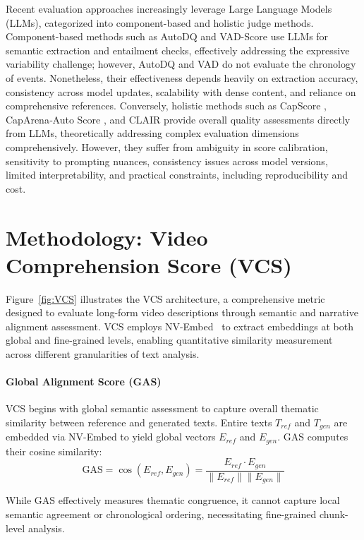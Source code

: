 \documentclass[letterpaper]{article} %
\begin{document}
Recent evaluation approaches increasingly leverage Large Language Models (LLMs), categorized into component-based and holistic judge methods. Component-based methods such as AutoDQ \citep{wyzs:24} and VAD-Score \citep{dp:25} use LLMs for semantic extraction and entailment checks, effectively addressing the expressive variability challenge; however, AutoDQ and VAD do not evaluate the chronology of events. Nonetheless, their effectiveness depends heavily on extraction accuracy, consistency across model updates, scalability with dense content, and reliance on comprehensive references. Conversely, holistic methods such as CapScore \citep{li:24}, CapArena‑Auto Score \citep{cheng:25}, and CLAIR \citep{chan:23} provide overall quality assessments directly from LLMs, theoretically addressing complex evaluation dimensions comprehensively. However, they suffer from ambiguity in score calibration, sensitivity to prompting nuances, consistency issues across model versions, limited interpretability, and practical constraints, including reproducibility and cost.

\section{Methodology: Video Comprehension Score (VCS)}
\label{sec:methodology_vcs}

Figure~\ref{fig:VCS} illustrates the VCS architecture, a comprehensive metric designed to evaluate long-form video descriptions through semantic and narrative alignment assessment. VCS employs NV-Embed~\cite{lee2024nv} to extract embeddings at both global and fine-grained levels, enabling quantitative similarity measurement across different granularities of text analysis.

\paragraph{Global Alignment Score (GAS)}
VCS begins with global semantic assessment to capture overall thematic similarity between reference and generated texts. Entire texts $T_{ref}$ and $T_{gen}$ are embedded via NV-Embed to yield global vectors $E_{ref}$ and $E_{gen}$. GAS computes their cosine similarity:
\begin{equation} \label{eq:gas_revised}
\text{GAS} = \cos(E_{ref}, E_{gen}) = \frac{E_{ref} \cdot E_{gen}}{\|E_{ref}\| \|E_{gen}\|}
\end{equation}

While GAS effectively measures thematic congruence, it cannot capture local semantic agreement or chronological ordering, necessitating fine-grained chunk-level analysis.
\end{document}
